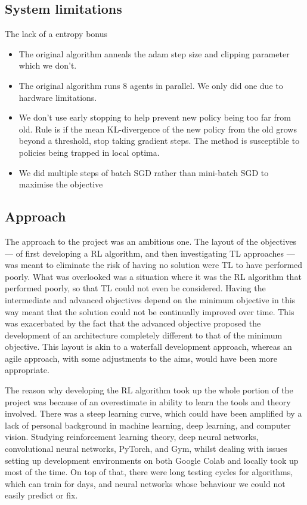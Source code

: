 \documentclass[12pt,a4paper]{article}
\begin{document}
\subsection{System limitations}
The lack of a entropy bonus 
\begin{itemize}
    \item The original algorithm anneals the adam step size and clipping parameter which we don't.
    \item The original algorithm runs 8 agents in parallel. We only did one due to hardware limitations.
    \item We don't use early stopping to help prevent new policy being too far from old. Rule is if the mean KL-divergence of the new policy from the old grows beyond a threshold, stop taking gradient steps. The method is susceptible to policies being trapped in local optima.
    \item We did multiple steps of batch SGD rather than mini-batch SGD to maximise the objective
\end{itemize}


\subsection{Approach}
The approach to the project was an ambitious one. The layout of the objectives --- of first developing a RL algorithm, and then investigating TL approaches --- was meant to eliminate the risk of having no solution were TL to have performed poorly. What was overlooked was a situation where it was the RL algorithm that performed poorly, so that TL could not even be considered. Having the intermediate and advanced objectives depend on the minimum objective in this way meant that the solution could not be continually improved over time. This was exacerbated by the fact that the advanced objective proposed the development of an architecture completely different to that of the minimum objective. This layout is akin to a waterfall development approach, whereas an agile approach, with some adjustments to the aims, would have been more appropriate. 

The reason why developing the RL algorithm took up the whole portion of the project was because of an overestimate in ability to learn the tools and theory involved. There was a steep learning curve, which could have been amplified by a lack of personal background in machine learning, deep learning, and computer vision. Studying reinforcement learning theory, deep neural networks, convolutional neural networks, PyTorch, and Gym, whilst dealing with issues setting up development environments on both Google Colab and locally took up most of the time. On top of that, there were long testing cycles for algorithms, which can train for days, and neural networks whose behaviour we could not easily predict or fix.
\end{document}
